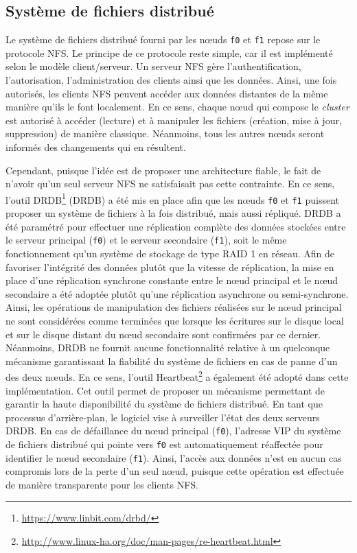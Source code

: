 \subsection{Système de fichiers distribué}

Le système de fichiers distribué fourni par les n\oe{}uds \texttt{f0} et \texttt{f1} repose sur le protocole \ac{NFS}. Le principe de ce protocole reste simple, car il est implémenté selon le modèle client/serveur. Un serveur \acs{NFS} gère l'authentification, l'autorisation, l'administration des clients ainsi que les données. Ainsi, une fois autorisés, les clients NFS peuvent accéder aux données distantes de la même manière qu'ils le font localement. En ce sens, chaque n\oe{}ud qui compose le \textit{cluster} est autorisé à accéder (lecture) et à manipuler les fichiers (création, mise à jour, suppression) de manière classique. Néanmoins, tous les autres n\oe{}uds seront informés des changements qui en résultent.

Cependant, puisque l'idée est de proposer une architecture fiable, le fait de n'avoir qu'un seul serveur \acs{NFS} ne satisfaisait pas cette contrainte. En ce sens, l'outil \acs{DRDB}\footnote{\url{https://www.linbit.com/drbd/}} (\acl{DRDB}) a été mis en place afin que les n\oe{}uds \texttt{f0} et \texttt{f1} puissent proposer un système de fichiers à la fois distribué, mais aussi répliqué. \acs{DRDB} a été paramétré pour effectuer une réplication complète des données stockées entre le serveur principal (\texttt{f0}) et le serveur secondaire (\texttt{f1}), soit le même fonctionnement qu'un système de stockage de type \acs{RAID} 1 en réseau. Afin de favoriser l'intégrité des données plutôt que la vitesse de réplication, la mise en place d'une réplication synchrone constante entre le n\oe{}ud principal et le n\oe{}ud secondaire a été adoptée plutôt qu'une réplication asynchrone ou semi-synchrone. Ainsi, les opérations de manipulation des fichiers réalisées sur le n\oe{}ud principal ne sont considérées comme terminées que lorsque les écritures sur le disque local et sur le disque distant du n\oe{}ud secondaire sont confirmées par ce dernier. Néanmoins, \acs{DRDB} ne fournit aucune fonctionnalité relative à un quelconque mécanisme garantissant la fiabilité du système de fichiers en cas de panne d'un des deux n\oe{}uds. En ce sens, l'outil Heartbeat\footnote{\url{http://www.linux-ha.org/doc/man-pages/re-heartbeat.html}} a également été adopté dans cette implémentation. Cet outil permet de proposer un mécanisme permettant de garantir la haute disponibilité du système de fichiers distribué. En tant que processus d'arrière-plan, le logiciel vise à surveiller l'état des deux serveurs \acs{DRDB}. En cas de défaillance du n\oe{}ud principal (\texttt{f0}), l'adresse \ac{VIP} du système de fichiers distribué qui pointe vers \texttt{f0} est automatiquement réaffectée pour identifier le n\oe{}ud secondaire (\texttt{f1}). Ainsi, l'accès aux données n'est en aucun cas compromis lors de la perte d'un seul n\oe{}ud, puisque cette opération est effectuée de manière transparente pour les clients \acs{NFS}.

